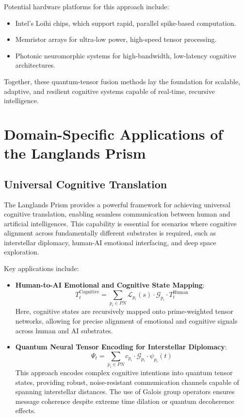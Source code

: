 \documentclass[11pt]{article}
\begin{document}
Potential hardware platforms for this approach include:
\begin{itemize}
    \item Intel's Loihi chips, which support rapid, parallel spike-based computation.
    \item Memristor arrays for ultra-low power, high-speed tensor processing.
    \item Photonic neuromorphic systems for high-bandwidth, low-latency cognitive architectures.
\end{itemize}

Together, these quantum-tensor fusion methods lay the foundation for scalable, adaptive, and resilient cognitive systems capable of real-time, recursive intelligence.

\section{Domain-Specific Applications of the Langlands Prism}

\subsection{Universal Cognitive Translation}

The Langlands Prism provides a powerful framework for achieving universal cognitive translation, enabling seamless communication between human and artificial intelligences. This capability is essential for scenarios where cognitive alignment across fundamentally different substrates is required, such as interstellar diplomacy, human-AI emotional interfacing, and deep space exploration.

Key applications include:

\begin{itemize}
    \item \textbf{Human-to-AI Emotional and Cognitive State Mapping}:
    \[
    T_t^{\text{Cognitive}} = \sum_{p_i \in PN} \mathcal{L}_{p_i}(s) \cdot \mathcal{G}_{p_i} \cdot T_t^{\text{Human}}
    \]
    Here, cognitive states are recursively mapped onto prime-weighted tensor networks, allowing for precise alignment of emotional and cognitive signals across human and AI substrates.

    \item \textbf{Quantum Neural Tensor Encoding for Interstellar Diplomacy}:
    \[
    \Psi_t = \sum_{p_i \in PN} c_{p_i} \cdot \mathcal{G}_{p_i} \cdot \psi_{p_i}(t)
    \]
    This approach encodes complex cognitive intentions into quantum tensor states, providing robust, noise-resistant communication channels capable of spanning interstellar distances. The use of Galois group operators ensures message coherence despite extreme time dilation or quantum decoherence effects.
\end{itemize}
\end{document}
